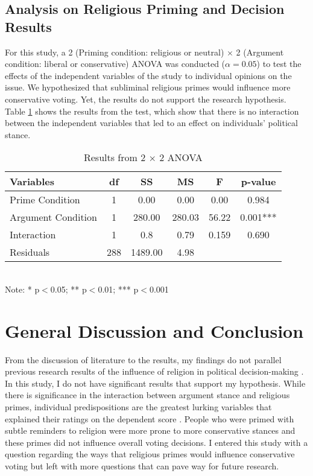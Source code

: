 \documentclass[letterpaper,man,natbib,noextraspace,12pt]{apa6}  %
\newcommand\tb{\textbf}
\begin{document}
\subsection{Analysis on Religious Priming and Decision Results}

For this study, a 2 (Priming condition: religious or neutral) $\times$ 2 (Argument condition: liberal or conservative) ANOVA was conducted ($\alpha = 0.05$) to test the effects of the independent variables of the study to individual opinions on the issue. We hypothesized that subliminal religious primes would influence more conservative voting. Yet, the results do not support the research hypothesis. Table \ref{AnovaResults} shows the results from the test, which show that there is no interaction between the independent variables that led to an effect on individuals' political stance. 

\begin{table}
	\caption{Results from 2 $\times$ 2 ANOVA}\label{AnovaResults}
	\begin{tabular}{lccccc}
		\hline
		\tb{Variables}&\tb{df}&\tb{SS}&\tb{MS}&\tb{F}&\tb{p-value}\\
		\hline
		Prime Condition&1&0.00&0.00&0.00&0.984\\
		Argument Condition&1&280.00&280.03&56.22&0.001***\\
		Interaction&1&0.8&0.79&0.159&0.690\\
		Residuals&288&1489.00&4.98&&\\
		\hline
	\end{tabular}\\
	Note: * p$<$0.05; ** p$<$0.01; *** p$<$0.001
\end{table}

\section{General Discussion and Conclusion}

From the discussion of literature to the results, my findings do not parallel previous research results of the influence of religion in political decision-making \citep{calfano_god_2009, rutchick_deus_2010}. In this study, I do not have significant results that support my hypothesis. While there is significance in the interaction between argument stance and religious primes, individual predispositions are the greatest lurking variables that explained their ratings on the dependent score \citep{mclaughlin_cueing_2014}. People who were primed with subtle reminders to religion were more prone to more conservative stances and these primes did not influence overall voting decisions. I entered this study with a question regarding the ways that religious primes would influence conservative voting but left with more questions that can pave way for future research. 
\end{document}
